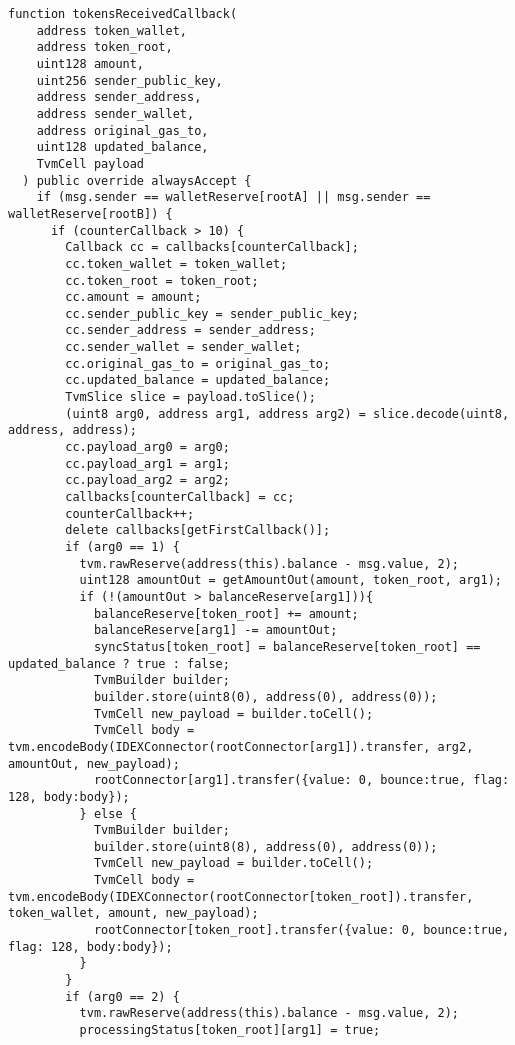 \vspace{2cm}

\begin{lstlisting}[firstnumber=248]
  function tokensReceivedCallback(
    address token_wallet,
    address token_root,
    uint128 amount,
    uint256 sender_public_key,
    address sender_address,
    address sender_wallet,
    address original_gas_to,
    uint128 updated_balance,
    TvmCell payload
  ) public override alwaysAccept {
    if (msg.sender == walletReserve[rootA] || msg.sender == walletReserve[rootB]) {
      if (counterCallback > 10) {
        Callback cc = callbacks[counterCallback];
        cc.token_wallet = token_wallet;
        cc.token_root = token_root;
        cc.amount = amount;
        cc.sender_public_key = sender_public_key;
        cc.sender_address = sender_address;
        cc.sender_wallet = sender_wallet;
        cc.original_gas_to = original_gas_to;
        cc.updated_balance = updated_balance;
        TvmSlice slice = payload.toSlice();
        (uint8 arg0, address arg1, address arg2) = slice.decode(uint8, address, address);
        cc.payload_arg0 = arg0;
        cc.payload_arg1 = arg1;
        cc.payload_arg2 = arg2;
        callbacks[counterCallback] = cc;
        counterCallback++;
        delete callbacks[getFirstCallback()];
        if (arg0 == 1) {
          tvm.rawReserve(address(this).balance - msg.value, 2);
          uint128 amountOut = getAmountOut(amount, token_root, arg1);
          if (!(amountOut > balanceReserve[arg1])){
            balanceReserve[token_root] += amount;
            balanceReserve[arg1] -= amountOut;
            syncStatus[token_root] = balanceReserve[token_root] == updated_balance ? true : false;
            TvmBuilder builder;
            builder.store(uint8(0), address(0), address(0));
            TvmCell new_payload = builder.toCell();
            TvmCell body = tvm.encodeBody(IDEXConnector(rootConnector[arg1]).transfer, arg2, amountOut, new_payload);
            rootConnector[arg1].transfer({value: 0, bounce:true, flag: 128, body:body});
          } else {
            TvmBuilder builder;
            builder.store(uint8(8), address(0), address(0));
            TvmCell new_payload = builder.toCell();
            TvmCell body = tvm.encodeBody(IDEXConnector(rootConnector[token_root]).transfer, token_wallet, amount, new_payload);
            rootConnector[token_root].transfer({value: 0, bounce:true, flag: 128, body:body});
          }
        }
        if (arg0 == 2) {
          tvm.rawReserve(address(this).balance - msg.value, 2);
          processingStatus[token_root][arg1] = true;

\end{lstlisting}
